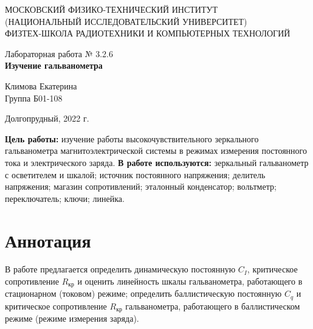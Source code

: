 \documentclass[a4paper,12pt]{article} %
\begin{document}
\begin{center}
	\footnotesize{МОСКОВСКИЙ ФИЗИКО-ТЕХНИЧЕСКИЙ ИНСТИТУТ\\(НАЦИОНАЛЬНЫЙ 			ИССЛЕДОВАТЕЛЬСКИЙ УНИВЕРСИТЕТ)}\\
	\footnotesize{ФИЗТЕХ-ШКОЛА РАДИОТЕХНИКИ И КОМПЬЮТЕРНЫХ ТЕХНОЛОГИЙ\\}
	\hfill \break
	\hfill \break
	\hfill \break
	\hfill \break
	\hfill \break
	\hfill \break
\end{center}

\begin{center}   
    \hfill \break
	\hfill \break
	\hfill \break
	\hfill \break
	\hfill \break
	\hfill \break
	\hfill \break
	\hfill \break
	\hfill \break
	\hfill \break
	\hfill \break
	\large{Лабораторная работа № 3.2.6\\\large{\textbf{Изучение гальванометра}}}\\
	\hfill \break
	\hfill \break
	\hfill \break
	\hfill \break
	\hfill \break
	\hfill \break
	\hfill \break
	\hfill \break
	\hfill \break
	\hfill \break
	\hfill \break
	\begin{flushright}
		Климова Екатерина\\
		Группа Б01-108
	\end{flushright}
	\hfill \break
\end{center}
\hfill \break
\hfill \break
\begin{center}
	Долгопрудный, 2022 г.
\end{center}
\thispagestyle{empty}

\newpage
\hfill \break
\textbf{Цель работы:} изучение работы высокочувствительного зеркального гальванометра магнитоэлектрической системы в режимах измерения постоянного тока и электрического заряда.
\hfill \break
\hfill \break
\textbf{В работе используются:} зеркальный гальванометр с осветителем и шкалой; источник постоянного напряжения; делитель напряжения; магазин сопротивлений; эталонный конденсатор; вольтметр; переключатель; ключи; линейка.

\section{Аннотация}
\hfill \break В работе предлагается определить динамическую постоянную $C_{I}$, критическое сопротивление $R_\text{кр}$ и оценить линейность шкалы гальванометра, работающего в стационарном (токовом) режиме; определить баллистическую постоянную $C_{q}$ и критическое сопротивление $R_\text{кр}$ гальванометра, работающего в баллистическом режиме (режиме измерения заряда).
\end{document}
